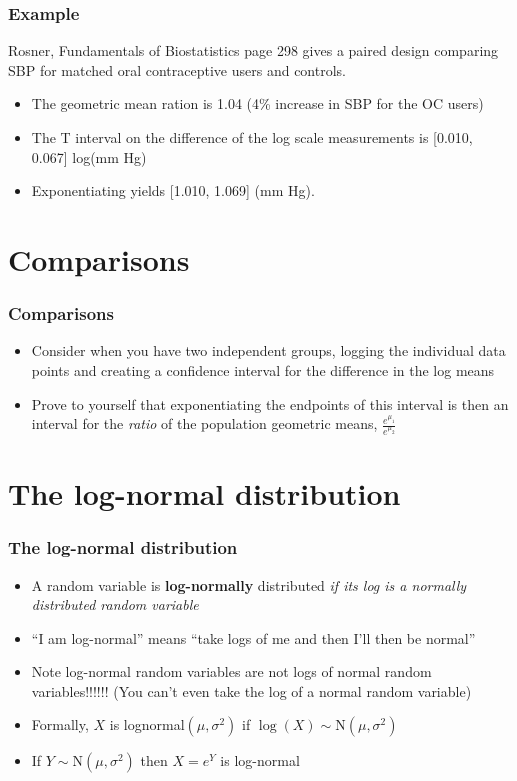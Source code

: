 \documentclass[aspectratio=169]{beamer}
\begin{document}
\begin{frame}\frametitle{Example}
Rosner, Fundamentals of Biostatistics page 298 gives a paired design comparing SBP for matched oral contraceptive users and controls.
\begin{itemize}
\item The geometric mean ration is 1.04 (4\% increase in SBP for the OC users)
\item The T interval on the difference of the log scale measurements is [0.010, 0.067] log(mm Hg)
\item Exponentiating yields [1.010, 1.069] (mm Hg). 
\end{itemize}


\end{frame}

\section{Comparisons}
\begin{frame}\frametitle{Comparisons}
\begin{itemize}
\item Consider when you have two independent groups, logging the
  individual data points and creating a confidence interval for the
  difference in the log means
\item Prove to yourself that exponentiating the endpoints of this
  interval is then an interval for the {\em ratio} of the population
  geometric means, $\frac{e^{\mu_1}}{e^{\mu_2}}$
\end{itemize}
\end{frame}

\section{The log-normal distribution}
\begin{frame}\frametitle{The log-normal distribution}
\begin{itemize}
\item A random variable is {\bf log-normally} distributed {\em if its log
    is a normally distributed random variable}
\item ``I am log-normal'' means ``take logs of me and then I'll then be normal''
\item Note log-normal random variables are not logs of normal random variables!!!!!! (You can't even take the log of a normal random variable)
\item Formally, $X$ is lognormal$(\mu,\sigma^2)$ if $\log(X) \sim \mbox{N}(\mu, \sigma^2)$
\item If $Y \sim \mbox{N}(\mu,\sigma^2)$ then $X = e^Y$ is log-normal
\end{itemize}
\end{frame} 
\end{document}
